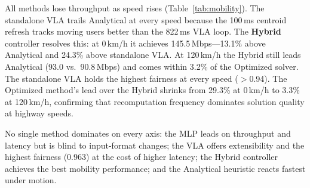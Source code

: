 \documentclass[journal]{IEEEtran}
\begin{document}
All methods lose throughput as speed rises (Table~\ref{tab:mobility}). The standalone VLA trails Analytical at every speed because the 100\,ms centroid refresh tracks moving users better than the 822\,ms VLA loop. The \textbf{Hybrid} controller resolves this: at 0\,km/h it achieves 145.5\,Mbps---13.1\% above Analytical and 24.3\% above standalone VLA. At 120\,km/h the Hybrid still leads Analytical (93.0 vs.\ 90.8\,Mbps) and comes within 3.2\% of the Optimized solver. The standalone VLA holds the highest fairness at every speed ($>$0.94). The Optimized method's lead over the Hybrid shrinks from 29.3\% at 0\,km/h to 3.3\% at 120\,km/h, confirming that recomputation frequency dominates solution quality at highway speeds.


No single method dominates on every axis: the MLP leads on throughput and latency but is blind to input-format changes; the VLA offers extensibility and the highest fairness (0.963) at the cost of higher latency; the Hybrid controller achieves the best mobility performance; and the Analytical heuristic reacts fastest under motion.
\end{document}
